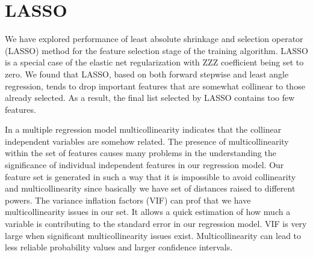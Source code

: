 \documentclass[aps,prl,reprint,amsmath,amssymb,nature]{revtex4-1}
\begin{document}



\newpage
\clearpage
\setcounter{figure}{0}
\setcounter{page}{1}
\renewcommand{\thefigure}{S\arabic{figure}}


\section{LASSO} 

We have explored performance of least absolute 
shrinkage and selection operator (LASSO) method for the feature 
selection stage of the training algorithm. LASSO is a special case of 
the elastic net regularization with ZZZ coefficient being set to zero. 
We found that LASSO, based on both forward stepwise and least angle 
regression, tends to drop important features that are somewhat collinear 
to those already selected. As a result, the final list selected by LASSO 
contains too few features.

In a multiple regression model multicollinearity indicates that the 
collinear independent variables are somehow related. The presence of 
multicollinearity within the set of features causes many problems in the 
understanding the significance of individual independent features in our 
regression model. Our feature set is generated in such a way that it is 
impossible to avoid collinearity and multicollinearity since basically 
we have set of distances raised to different powers. The variance 
inflation factors (VIF) can prof that we have multicollinearity issues 
in our set. It allows a quick estimation of how much a variable is 
contributing to the standard error in our regression model. VIF is very 
large when significant multicollinearity issues exist. Multicollinearity 
can lead to less reliable probability values and larger confidence 
intervals.
\end{document}
